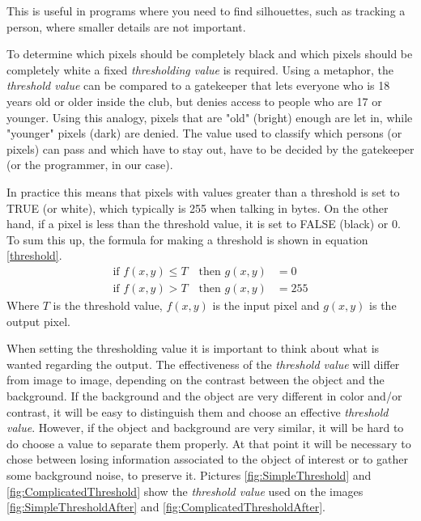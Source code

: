 This is useful in programs where you need to find silhouettes, such as tracking a person, where smaller details are not important.

To determine which pixels should be completely black and which pixels should be completely white a fixed \textit{thresholding value} is required. Using a metaphor, the \textit{threshold value} can be compared to a gatekeeper that lets everyone who is 18 years old or older inside the club, but denies access to people who are 17 or younger. Using this analogy, pixels that are "old" (bright) enough are let in, while "younger" pixels (dark) are denied. The value used to classify which persons (or pixels) can pass and which have to stay out, have to be decided by the gatekeeper (or the programmer, in our case).

In practice this means that pixels with values greater than a threshold is set to TRUE (or white), which typically is 255 when talking in bytes. On the other hand, if a pixel is less than the threshold value, it is set to FALSE (black) or 0. To sum this up, the formula for making a threshold is shown in equation \ref{threshold}.
\begin{equation}
  \begin{aligned}
  	\text{if } f(x,y)\leq T \quad \text{then } g(x,y)&= 0 \\
  	\text{if } f(x,y)>T \quad \text{then } g(x,y)&= 255
	\label{threshold}  
  \end{aligned} 
\end{equation}
Where $T$ is the threshold value, $f(x,y)$ is the input pixel and $g(x,y)$ is the output pixel. 

When setting the thresholding value it is important to think about what is wanted regarding the output. The effectiveness of the \textit{threshold value} will differ from image to image, depending on the contrast between the object and the background. If the background and the object are very different in color and/or contrast, it will be easy to distinguish them and choose an effective \textit{threshold value}. However, if the object and background are very similar, it will be hard to do choose a value to separate them properly. At that point it will be necessary to chose between losing information associated to the object of interest or to gather some background noise, to preserve it. Pictures \ref{fig:SimpleThreshold} and \ref{fig:ComplicatedThreshold} show the \textit{threshold value} used on the images \ref{fig:SimpleThresholdAfter} and \ref{fig:ComplicatedThresholdAfter}.

